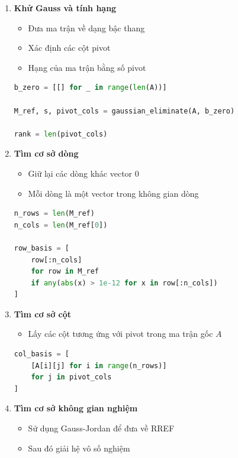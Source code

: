 \documentclass[a4paper,12pt]{report}
\begin{document}
\begin{enumerate}

\item \textbf{Khử Gauss và tính hạng}

\begin{itemize}
    \item Đưa ma trận về dạng bậc thang
    \item Xác định các cột pivot
    \item Hạng của ma trận bằng số pivot
\end{itemize}

\begin{lstlisting}[language=Python, caption={Khử Gauss và tính rank}]
b_zero = [[] for _ in range(len(A))]

M_ref, s, pivot_cols = gaussian_eliminate(A, b_zero)

rank = len(pivot_cols)
\end{lstlisting}

\item \textbf{Tìm cơ sở dòng}

\begin{itemize}
    \item Giữ lại các dòng khác vector 0
    \item Mỗi dòng là một vector trong không gian dòng
\end{itemize}

\begin{lstlisting}[language=Python, caption={Cơ sở dòng}]
n_rows = len(M_ref)
n_cols = len(M_ref[0])

row_basis = [
    row[:n_cols]
    for row in M_ref
    if any(abs(x) > 1e-12 for x in row[:n_cols])
]
\end{lstlisting}

\item \textbf{Tìm cơ sở cột}

\begin{itemize}
    \item Lấy các cột tương ứng với pivot trong ma trận gốc $A$
\end{itemize}

\begin{lstlisting}[language=Python, caption={Cơ sở cột}]
col_basis = [
    [A[i][j] for i in range(n_rows)]
    for j in pivot_cols
]
\end{lstlisting}

\item \textbf{Tìm cơ sở không gian nghiệm}

\begin{itemize}
    \item Sử dụng Gauss-Jordan để đưa về RREF
    \item Sau đó giải hệ vô số nghiệm
\end{itemize}


\end{enumerate}
\end{document}
